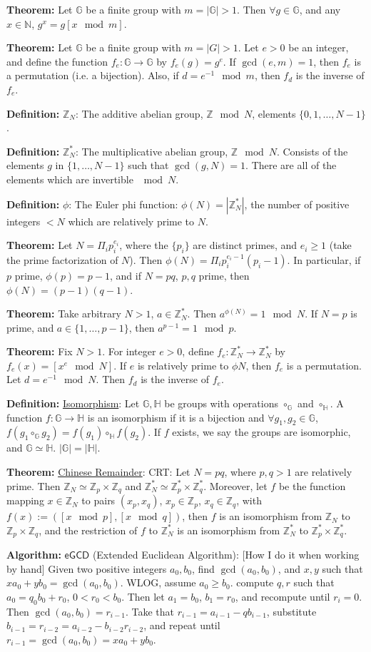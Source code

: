 \documentclass[10pt]{article}
\newcommand{\Z}{\mathbb{Z}}
\newcommand{\N}{\mathbb{N}}
\newcommand{\G}{\mathbb{G}}
\newcommand{\HH}{\mathbb{H}}
\newcommand{\defn}[1]{{\bf Definition:} \underline{#1}}
\newcommand{\thm}[1]{{\bf Theorem:} \underline{#1}}
\newcommand{\alg}[1]{{\bf Algorithm:} \underline{#1}}
\begin{document}
\begin{multicols}{3}
\thm{}Let $\G$ be a finite group with $m=|\G|>1$. Then $\forall g\in\G$, and any $x\in\N$, $g^{x}=g{[x\mod{m}]}$.

\thm{}Let $\G$ be a finite group with $m=|G|>1$. Let $e>0$ be an integer, and define the function $f_e:\G\to\G$ by $f_e(g)=g^e$. If $\gcd(e,m)=1$, then $f_e$ is a permutation (i.e. a bijection). Also, if $d=e^{-1}\mod{m}$, then $f_d$ is the inverse of $f_e$.

\defn{$\Z_N$}: The additive abelian group, $\Z\mod{N}$, elements $\{0,1,\dots,N-1\}$. 

\defn{$\Z_N^*$}: The multiplicative abelian group, $\Z\mod{N}$. Consists of the elements $g$ in $\{1,\dots,N-1\}$ such that $\gcd(g,N)=1$. There are all of the elements which are invertible $\mod{N}$.

\defn{$\phi$}: The Euler phi function: $\phi(N)=|\Z_N^*|$, the number of positive integers $<N$ which are relatively prime to $N$.

\thm{}Let $N=\Pi_ip_i^{e_i}$, where the $\{p_i\}$ are distinct primes, and $e_i\geq 1$ (take the prime factorization of $N$). Then $\phi(N)=\Pi_ip_i^{e_i-1}(p_i-1)$. In particular, if $p$ prime, $\phi(p)=p-1$, and if $N=pq$, $p,q$ prime, then $\phi(N)=(p-1)(q-1)$.

\thm{}Take arbitrary $N>1$, $a\in\Z_N^*$. Then $a^{\phi(N)}=1\mod{N}$. If $N=p$ is prime, and $a\in\{1,\dots,p-1\}$, then $a^{p-1}=1\mod{p}$.

\thm{}Fix $N>1$. For integer $e>0$, define $f_e:\Z_N^*\to\Z_N^*$ by $f_e(x)=[x^e\mod{N}]$. If $e$ is relatively prime to $\phi{N}$, then $f_e$ is a permutation. Let $d=e^{-1}\mod{N}$. Then $f_d$ is the inverse of $f_e$.

\defn{Isomorphism}: Let $\G,\HH$ be groups with operations $\circ_\G$ and $\circ_\HH$. A function $f:\G\to\HH$ is an isomorphism if it is a bijection and $\forall g_1,g_2\in\G$, $f(g_1\circ_\G g_2)=f(g_1)\circ_\HH f(g_2)$. If $f$ exists, we say the groups are isomorphic, and $\G\simeq\HH$. $|\G|=|\HH|$.

\thm{Chinese Remainder}: CRT: Let $N=pq$, where $p,q>1$ are relatively prime. Then $\Z_N\simeq\Z_p\times\Z_q$ and $\Z_N^*\simeq\Z_p^*\times\Z_q^*$. Moreover, let $f$ be the function mapping $x\in\Z_N$ to pairs $(x_p,x_q)$, $x_p\in\Z_p$, $x_q\in\Z_q$, with $f(x):=([x\mod{p}],[x\mod{q}])$, then $f$ is an isomorphism from $\Z_N$ to $\Z_p\times\Z_q$, and the restriction of $f$ to $\Z_N^*$ is an isomorphism from $\Z_N^*$ to $\Z_p^*\times\Z_q^*$.

\alg{$\mathsf{eGCD}$} (Extended Euclidean Algorithm): [How I do it when working by hand] Given two positive integers $a_0,b_0$, find $\gcd(a_0,b_0)$, and $x,y$ such that $xa_0+yb_0=\gcd(a_0,b_0)$. WLOG, assume $a_0\geq b_0$. compute $q,r$ such that $a_0=q_0b_0+r_0$, $0<r_0<b_0$. Then let $a_1=b_0$, $b_1=r_0$, and recompute until $r_i=0$. Then $\gcd(a_0,b_0)=r_{i-1}$. Take that $r_{i-1}=a_{i-1}-qb_{i-1}$, substitute $b_{i-1}=r_{i-2}=a_{i-2}-b_{i-2}r_{i-2}$, and repeat until $r_{i-1}=\gcd(a_0,b_0)=xa_0+yb_0$.


\end{multicols}
\end{document}

